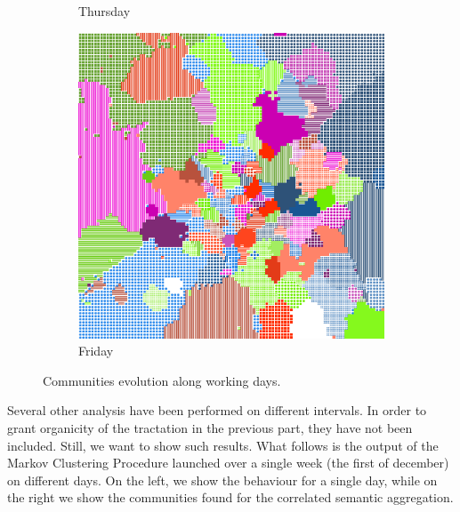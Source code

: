 \documentclass[12pt,a4paper]{article}
\begin{document}
\begin{figure}[H]
\begin{subfigure}[b]{0.35\textwidth}
\caption{Thursday}
\end{subfigure}
\begin{subfigure}[b]{0.35\textwidth}
\includegraphics[width=\textwidth]{weekDef/5Fri.png}
\caption{Friday}
\end{subfigure}
\caption{Communities evolution along working days.}
\label{fig:allworking}
\end{figure}

Several other analysis have been performed on different intervals. In order to grant organicity of the tractation in the previous part, they have not been included.
Still, we want to show such results.
What follows is the output of the Markov Clustering Procedure launched over a single week (the first of december) on different days. On the left, we show the behaviour for a single day, while on the right we show the communities found for the correlated semantic aggregation.
\end{document}
